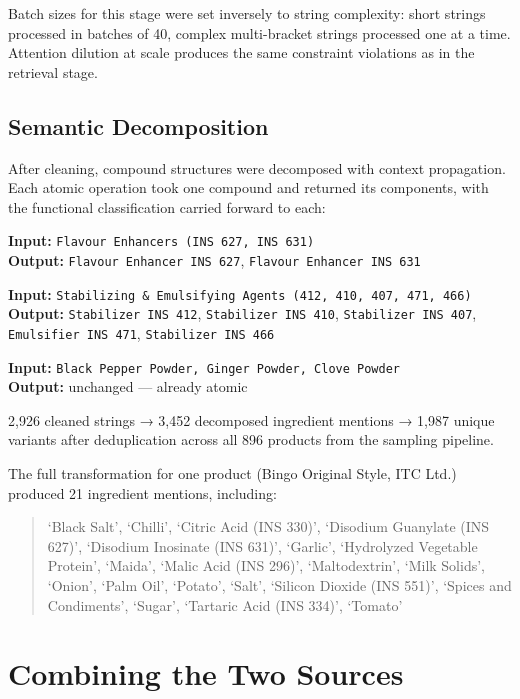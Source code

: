 \documentclass[
  letterpaper,
  DIV=11,
  numbers=noendperiod]{scrartcl}
\begin{document}
Batch sizes for this stage were set inversely to string complexity:
short strings processed in batches of 40, complex multi-bracket strings
processed one at a time. Attention dilution at scale produces the same
constraint violations as in the retrieval stage.

\subsection{Semantic Decomposition}\label{semantic-decomposition}

After cleaning, compound structures were decomposed with context
propagation. Each atomic operation took one compound and returned its
components, with the functional classification carried forward to each:

\textbf{Input:} \texttt{Flavour\ Enhancers\ (INS\ 627,\ INS\ 631)}\\
\textbf{Output:} \texttt{Flavour\ Enhancer\ INS\ 627},
\texttt{Flavour\ Enhancer\ INS\ 631}

\textbf{Input:}
\texttt{Stabilizing\ \&\ Emulsifying\ Agents\ (412,\ 410,\ 407,\ 471,\ 466)}\\
\textbf{Output:} \texttt{Stabilizer\ INS\ 412},
\texttt{Stabilizer\ INS\ 410}, \texttt{Stabilizer\ INS\ 407},
\texttt{Emulsifier\ INS\ 471}, \texttt{Stabilizer\ INS\ 466}

\textbf{Input:}
\texttt{Black\ Pepper\ Powder,\ Ginger\ Powder,\ Clove\ Powder}\\
\textbf{Output:} unchanged --- already atomic

2,926 cleaned strings → 3,452 decomposed ingredient mentions → 1,987
unique variants after deduplication across all 896 products from the
sampling pipeline.

The full transformation for one product (Bingo Original Style, ITC Ltd.)
produced 21 ingredient mentions, including:

\begin{quote}
`Black Salt', `Chilli', `Citric Acid (INS 330)', `Disodium Guanylate
(INS 627)', `Disodium Inosinate (INS 631)', `Garlic', `Hydrolyzed
Vegetable Protein', `Maida', `Malic Acid (INS 296)', `Maltodextrin',
`Milk Solids', `Onion', `Palm Oil', `Potato', `Salt', `Silicon Dioxide
(INS 551)', `Spices and Condiments', `Sugar', `Tartaric Acid (INS 334)',
`Tomato'
\end{quote}

\section{Combining the Two Sources}\label{combining-the-two-sources}
\end{document}

